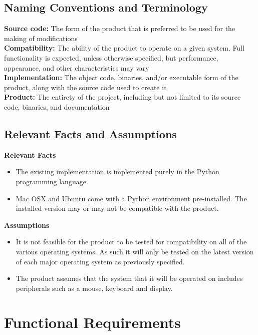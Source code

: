 \documentclass{article}
\begin{document}
		\subsection{Naming Conventions and Terminology}
		\textbf {Source code:} The form of the product that is preferred to be used
		for the making of modifications\\
		\textbf {Compatibility:} The ability of the product to operate on a given
		system. Full functionality is expected, unless otherwise specified, but
		performance, appearance, and other characteristics may vary\\
		\textbf {Implementation:} The object code, binaries, and/or executable form
		of the product, along with the source code used to create it\\
		\textbf {Product:} The entirety of the project, including but not limited to
		its source code, binaries, and documentation\\
		
		\subsection{Relevant Facts and Assumptions}
		
		\textbf{Relevant Facts}
		\vspace{-2mm}
		\begin{itemize}
			\itemsep0em
			\item The existing implementation is implemented purely in 
			the Python programming language.
			\item Mac OSX and Ubuntu come with a Python environment 
			pre-installed. The installed version may or may not be compatible 
			with 
			the product.
		\end{itemize}
		\textbf{Assumptions}
		\vspace{-2mm}
		\begin{itemize}
			\itemsep0em
			\item 	It is not feasible for the product to be tested for 
			compatibility on all of the various operating systems. As such it 
			will only be tested on the latest version of each major operating 
			system as previously specified.
			\item The product assumes that the system that it will be operated 
			on includes peripherals such as a mouse, keyboard and display.
		\end{itemize}
		
	\section{Functional Requirements}
\end{document}
